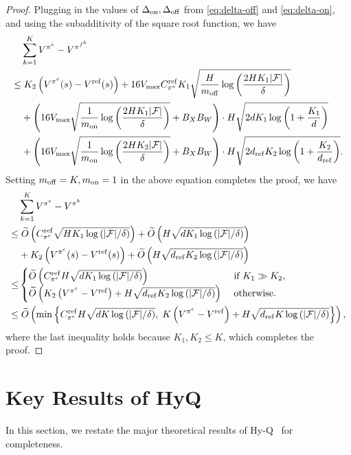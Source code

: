 \begin{proof}
Plugging in the values of $\Delta_\mathrm{on},\Delta_\mathrm{off}$ from \eqref{eq:delta-off} and \eqref{eq:delta-on}, and using the subadditivity of the square root function, we have 
{\small
\begin{equation}
    \begin{split}
        &\sum_{k=1}^K V^{\pi^e}-V^{\pi^{f^k}}\\
        \leq&\;K_2\left( V^{\pi^e}(s)-V^{\mathrm{ref}}(s) \right)+
        16V_{\max}  C_{\pi^e}^\mathrm{ref}K_1\sqrt{\frac{H}{m_\mathrm{off}}\log\left( \frac{2HK_1|\mathcal F|}{\delta} \right)}\\
        \;&+ \left( 16V_{\max}\sqrt{\frac{1}{m_\mathrm{on}}\log\left( \frac{2HK_1|\mathcal F|}{\delta} \right)}+B_XB_W \right)\cdot H\sqrt{2dK_1\log\left( 1+\frac{K_1}{d} \right)}\\
        \;&+ \left( 16V_{\max}\sqrt{\frac{1}{m_\mathrm{on}}\log\left( \frac{2HK_2|\mathcal F|}{\delta} \right)}+B_XB_W \right)\cdot H\sqrt{2d_\mathrm{ref}K_2\log\left( 1+\frac{K_2}{d_\mathrm{ref}} \right)}.
    \end{split}
\end{equation}
}
Setting $m_\mathrm{off} = K,m_\mathrm{on}=1$ in the above equation completes the proof, we have
\begin{equation}
    \begin{split}
        &\sum_{k=1}^KV^{\pi^e}-V^{\pi^k}\\
        \leq&\; \widetilde{O}\left( C_{\pi^e}^\mathrm{ref}\sqrt{HK_1\log\left( |\mathcal F|/\delta \right)} \right) + \widetilde{O}\left( H \sqrt{dK_1\log\left( |\mathcal F|/\delta \right)} \right)\\
        &+K_2\left( V^{\pi^e}(s)-V^{\mathrm{ref}}(s) \right)+\widetilde{O}\left( H \sqrt{d_\mathrm{ref}K_2\log\left( |\mathcal F|/\delta \right)} \right)\\
        \leq &\begin{cases}
            \widetilde{O}\left( C^\mathrm{ref}_{\pi^e}H\sqrt{dK_1\log\left( |\mathcal F|/\delta \right)} \right)&\text{ if } K_1\gg K_2,\\
            \widetilde{O}\left( K_2\left( V^{\pi^e}-V^\mathrm{ref} \right)+H\sqrt{d_\mathrm{ref}K_2\log\left( |\mathcal F|/\delta \right)} \right)&\text{ otherwise.} 
        \end{cases}\\
        \leq&\; \widetilde{O}\left( \min\left\{ C_{\pi^e}^\mathrm{ref}H\sqrt{dK\log\left( |\mathcal F|/\delta \right)},\;K\left( V^{\pi^e}-V^\mathrm{ref} \right)+H\sqrt{d_\mathrm{ref}K\log\left( |\mathcal F|/\delta \right)} \right\} \right),
    \end{split} 
\end{equation}
where the last inequality holds because $K_1,K_2\leq K$, which completes the proof.
\end{proof}

\section{Key Results of HyQ~\citep{song2023hybrid}}
In this section, we restate the major theoretical results of Hy-Q~\citep{song2023hybrid} for completeness. 


